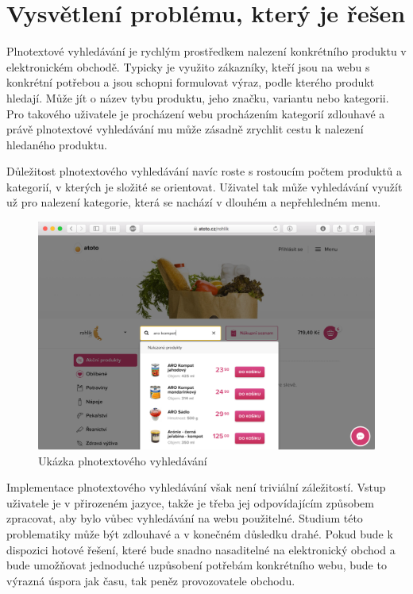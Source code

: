 \documentclass[FM,DP]{tulthesis}
\begin{document}
\section{Vysvětlení problému, který je řešen}

Plnotextové vyhledávání je rychlým prostředkem nalezení konkrétního produktu
v elektronickém obchodě. Typicky je využito zákazníky, kteří jsou na webu
s konkrétní potřebou a jsou schopni formulovat výraz, podle kterého produkt
hledají. Může jít o název tybu produktu, jeho značku, variantu nebo kategorii.
Pro takového uživatele je procházení webu procházením kategorií zdlouhavé
a právě plnotextové vyhledávání mu může zásadně zrychlit cestu k nalezení 
hledaného produktu.

Důležitost plnotextového vyhledávání navíc roste s rostoucím počtem produktů a kategorií, 
v kterých je složité se orientovat. Uživatel tak může vyhledávání využít už pro 
nalezení kategorie, která se nachází v dlouhém a nepřehledném menu.

\begin{figure}[h]
\center
\includegraphics[width=\textwidth]{atoto-full-text.png}
\caption{Ukázka plnotextového vyhledávání}
\label{foto}
\end{figure}

Implementace plnotextového vyhledávání však není triviální záležitostí. Vstup uživatele
je v přirozeném jazyce, takže je třeba jej odpovídajícím způsobem zpracovat, 
aby bylo vůbec vyhledávání na webu použitelné. Studium této problematiky
může být zdlouhavé a v konečném důsledku drahé. Pokud bude k dispozici hotové řešení, 
které bude snadno nasaditelné na elektronický obchod a bude umožňovat jednoduché 
uzpůsobení potřebám konkrétního webu, bude to výrazná úspora jak času, tak peněz
provozovatele obchodu.
\end{document}
